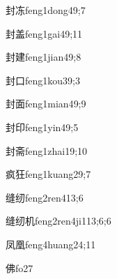 \begin{verbete}{封冻}{feng1dong4}{9;7}
\end{verbete}

\begin{verbete}{封盖}{feng1gai4}{9;11}
\end{verbete}

\begin{verbete}{封建}{feng1jian4}{9;8}
\end{verbete}

\begin{verbete}{封口}{feng1kou3}{9;3}
\end{verbete}

\begin{verbete}{封面}{feng1mian4}{9;9}
\end{verbete}

\begin{verbete}{封印}{feng1yin4}{9;5}
\end{verbete}

\begin{verbete}{封斋}{feng1zhai1}{9;10}
\end{verbete}

\begin{verbete}{疯狂}{feng1kuang2}{9;7}
\end{verbete}

\begin{verbete}{缝纫}{feng2ren4}{13;6}
\end{verbete}

\begin{verbete}{缝纫机}{feng2ren4ji1}{13;6;6}
\end{verbete}

\begin{verbete}{凤凰}{feng4huang2}{4;11}
\end{verbete}

\begin{verbete}{佛}{fo2}{7}
\end{verbete}

